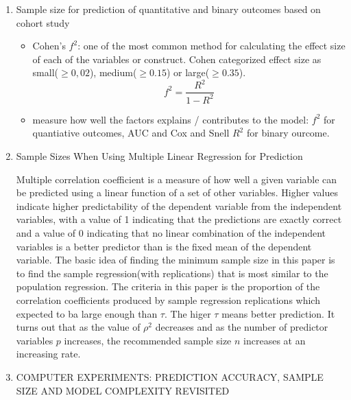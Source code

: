 \documentclass[
11pt, %
english, %
singlespacing, %
headsepline, %
]{MastersDoctoralThesis} %
\begin{document}
\begin{enumerate}
\item Sample size for prediction of quantitative and binary outcomes based on cohort study
\begin{itemize}
\item Cohen's $f^2$: one of the most common method for calculating the effect size of each of the variables or construct. Cohen categorized effect size as small($\ge 0,02$), medium($\ge 0.15$) or large($\ge0.35$). $$f^2 = \frac{R^2}{1-R^2}$$
\item measure how well the factors explains / contributes to the model: $f^2$ for quantiative outcomes, AUC and Cox and Snell $R^2$ for binary ourcome.


\end{itemize}

\item Sample Sizes When Using Multiple Linear Regression for Prediction

Multiple correlation coefficient is a measure of how well a given variable can be predicted using a linear function of a set of other variables.  Higher values indicate higher predictability of the dependent variable from the independent variables, with a value of 1 indicating that the predictions are exactly correct and a value of 0 indicating that no linear combination of the independent variables is a better predictor than is the fixed mean of the dependent variable. The basic idea of finding the minimum sample size in this paper is to find the sample regression(with replications) that is most similar to the population regression. The criteria in this paper is the proportion of the correlation coefficients produced by sample regression replications which expected to ba large enough than $\tau$. The higer $\tau$ means better prediction. It turns out that as the value of $\rho^2$ decreases and as the number of predictor variables $p$ increases, the recommended sample size $n$ increases at an increasing rate.

\item COMPUTER EXPERIMENTS: PREDICTION ACCURACY,
SAMPLE SIZE AND MODEL COMPLEXITY REVISITED


\end{enumerate}
\end{document}
